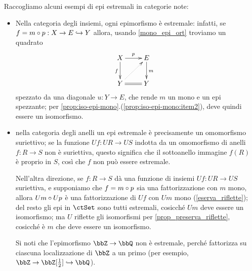\begin{remark}
	Raccogliamo alcuni esempi di epi estremali in categorie note:
	\begin{itemize}
		\item Nella categoria degli insiemi, ogni epimorfismo è estremale: infatti, se \(f = m\circ p : X \to E \hookrightarrow Y\) allora, usando \ref{mono_epi_ort} troviamo un quadrato
		      \[\xymatrix{
				      X \ar[r]^p\ar[d]_f & E\ar[d]^m \\
				      Y \ar@{=}[r]\ar@{.>}[ur] & Y
			      }\]
		      spezzato da una diagonale \(u : Y \to E\), che rende \(m\) un mono e un epi spezzante; per \ref{prop:iso-epi-mono}.(\ref{prop:iso-epi-mono:item2}), deve quindi essere un isomorfismo.
		\item nella categoria degli anelli un epi estremale è precisamente un omomorfismo suriettivo; se la funzione \(Uf : UR\to US\) indotta da un omomorfismo di anelli \(f : R\to S\) non è suriettiva, questo significa che il sottoanello immagine \(f(R)\) è proprio in \(S\), così che \(f\) non può essere estremale.

		      Nell'altra direzione, se \(f : R\to S\) dà una funzione di insiemi \(Uf : UR\to US\) suriettiva, e supponiamo che \(f = m\circ p\) sia una fattorizzazione con \(m\) mono, allora \(Um\circ Up\) è una fattorizzazione di \(Uf\) con \(Um\) mono (\ref{eserva_riflette}); del resto gli epi in \(\ctSet\) sono tutti estremali, cosicché \(Um\) deve essere un isomorfismo; ma \(U\) riflette gli isomorfismi per \ref{prop_preserva_riflette}, cosicché è \(m\) che deve essere un isomorfismo.

		      Si noti che l'epimorfismo \(\bbZ\to\bbQ\) non è estremale, perché fattorizza su ciascuna localizzazione di \(\bbZ\) a un primo (per esempio, \(\bbZ \to \bbZ[\frac 12]\mono \bbQ\)).
	\end{itemize}
\end{remark}
